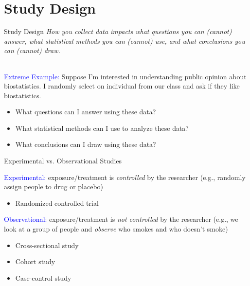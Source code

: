 \documentclass[10pt,t]{beamer}
\begin{document}
\section{Study Design}

\begin{frame}{Study Design}
\textit{How you collect data impacts what questions you can (cannot) answer, what statistical methods you can (cannot) use, and what conclusions you can (cannot) draw.} \\~\

\textcolor{blue}{Extreme Example:} Suppose I'm interested in understanding public opinion about biostatistics. I randomly select on individual from our class and ask if they like biostatistics.

\begin{itemize}
	\item What questions can I answer using these data?
	\item What statistical methods can I use to analyze these data?
	\item What conclusions can I draw using these data?
\end{itemize}
\end{frame}

\begin{frame}{Experimental vs. Observational Studies}

\textcolor{blue}{Experimental:} exposure/treatment is \textit{controlled} by the researcher (e.g., randomly assign people to drug or placebo)
\begin{itemize}
	\item Randomized controlled trial 
\end{itemize}

\vspace{0.3cm}

\textcolor{blue}{Observational:} exposure/treatment is \textit{not controlled} by the researcher (e.g., we look at a group of people and \textit{observe} who smokes and who doesn't smoke)
\begin{itemize}
	\item Cross-sectional study
	\item Cohort study
	\item Case-control study
\end{itemize}
\end{frame}
	
\end{document}
